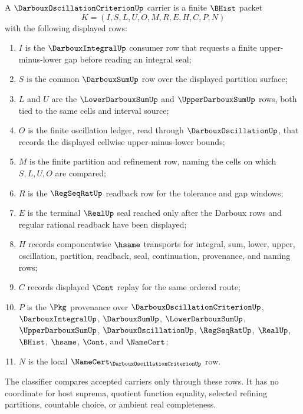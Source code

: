 \begin{definition}
\label{def:darboux-oscillation-criterion-carrier}
A $\DarbouxOscillationCriterionUp$ carrier is a finite $\BHist$ packet
$$
K=(I,S,L,U,O,M,R,E,H,C,P,N)
$$
with the following displayed rows:
\begin{enumerate}
\item $I$ is the $\DarbouxIntegralUp$ consumer row that requests a finite upper-minus-lower gap before reading an integral seal;
\item $S$ is the common $\DarbouxSumUp$ row over the displayed partition surface;
\item $L$ and $U$ are the $\LowerDarbouxSumUp$ and $\UpperDarbouxSumUp$ rows, both tied to the same cells and interval source;
\item $O$ is the finite oscillation ledger, read through $\DarbouxOscillationUp$, that records the displayed cellwise upper-minus-lower bounds;
\item $M$ is the finite partition and refinement row, naming the cells on which $S,L,U,O$ are compared;
\item $R$ is the $\RegSeqRatUp$ readback row for the tolerance and gap windows;
\item $E$ is the terminal $\RealUp$ seal reached only after the Darboux rows and regular rational readback have been displayed;
\item $H$ records componentwise $\hsame$ transports for integral, sum, lower, upper, oscillation, partition, readback, seal, continuation, provenance, and naming rows;
\item $C$ records displayed $\Cont$ replay for the same ordered route;
\item $P$ is the $\Pkg$ provenance over $\DarbouxOscillationCriterionUp$, $\DarbouxIntegralUp$, $\DarbouxSumUp$, $\LowerDarbouxSumUp$, $\UpperDarbouxSumUp$, $\DarbouxOscillationUp$, $\RegSeqRatUp$, $\RealUp$, $\BHist$, $\hsame$, $\Cont$, and $\NameCert$;
\item $N$ is the local $\NameCert_{\DarbouxOscillationCriterionUp}$ row.
\end{enumerate}
The classifier compares accepted carriers only through these rows. It has no coordinate for host suprema, quotient function equality, selected refining partitions, countable choice, or ambient real completeness.
\end{definition}

